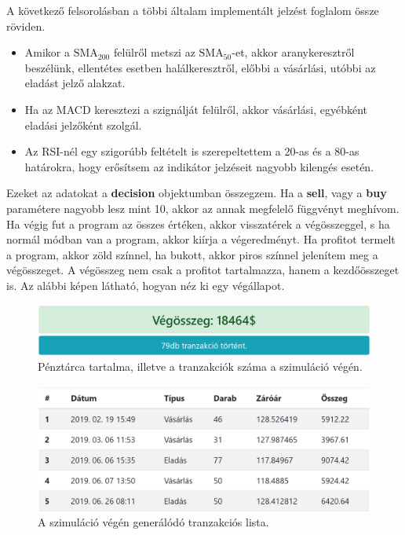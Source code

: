 \noindent A következő felsorolásban a többi általam implementált jelzést foglalom össze röviden.
\begin{itemize}
  \item Amikor a $\text{SMA}_{200}$ felülről metszi az $\text{SMA}_{50}$-et, akkor aranykeresztről beszélünk, ellentétes esetben halálkeresztről, előbbi a vásárlási, utóbbi az eladást jelző alakzat.
  \item Ha az MACD keresztezi a szignálját felülről, akkor vásárlási, egyébként eladási jelzőként szolgál.
  \item Az RSI-nél egy szigorúbb feltételt is szerepeltettem a 20-as és a 80-as határokra, hogy erősítsem az indikátor jelzéseit nagyobb kilengés esetén.
\end{itemize}
Ezeket az adatokat a \textbf{decision} objektumban összegzem. Ha a \textbf{sell}, vagy a \textbf{buy} paramétere nagyobb lesz mint 10, akkor az annak megfelelő függvényt meghívom. Ha végig fut a program az összes értéken, akkor visszatérek a végösszeggel, s ha normál módban van a program, akkor kiírja a végeredményt. Ha profitot termelt a program, akkor zöld színnel, ha bukott, akkor piros színnel jelenítem meg a végösszeget. A végösszeg nem csak a profitot tartalmazza, hanem a kezdőösszeget is. Az alábbi képen látható, hogyan néz ki egy végállapot.
\begin{figure}[ht]
\centering
\includegraphics[width=\textwidth]{images/website_results.png}
\caption{Pénztárca tartalma, illetve a tranzakciók száma a szimuláció végén.}
\label{fig:website_results}
\end{figure}
\begin{figure}[ht]
\centering
\includegraphics[width=\textwidth]{images/website_transactions.png}
\caption{A szimuláció végén generálódó tranzakciós lista.}
\label{fig:website_transactions}
\end{figure}
